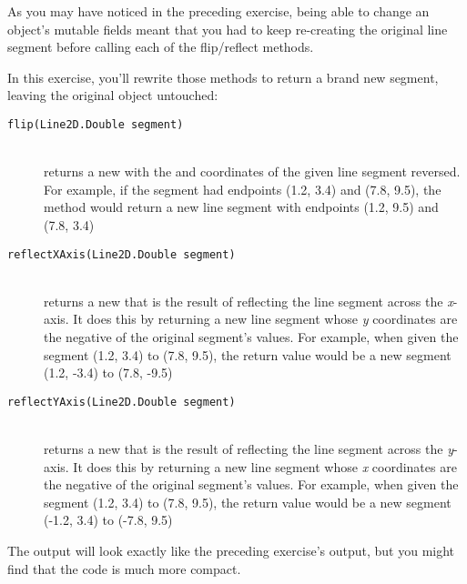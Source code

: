 \begin{exercise}
As you may have noticed in the preceding exercise, being able to change an object's mutable fields meant that you had to keep re-creating the original line segment before calling each of the flip/reflect methods.

In this exercise, you'll rewrite those methods to return a brand new  segment, leaving the original object untouched:

\begin{description}
  \item[\texttt{flip(Line2D.Double segment)}] \hfill \\ returns a new  with the  and  coordinates of the given line segment reversed. For example, if the segment had endpoints (1.2, 3.4) and (7.8, 9.5), the method would return a new line segment with endpoints (1.2, 9.5) and (7.8, 3.4)
  \item[\texttt{reflectXAxis(Line2D.Double segment)}] \hfill \\ returns a new  that is the result of reflecting the line segment across the {\em x}-axis. It does this by returning a new line segment whose {\em y} coordinates are the negative of the original segment's values. For example, when given the segment (1.2, 3.4) to (7.8, 9.5), the return value would be a new segment (1.2, -3.4) to (7.8, -9.5)
  \item[\texttt{reflectYAxis(Line2D.Double segment)}] \hfill \\ returns a new  that is the result of reflecting the line segment across the {\em y}-axis. It does this by returning a new line segment whose {\em x} coordinates are the negative of the original segment's values.  For example, when given the segment (1.2, 3.4) to (7.8, 9.5), the return value would be a new segment (-1.2, 3.4) to (-7.8, 9.5)
\end{description}

The output will look exactly like the preceding exercise's output, but you might find that the code is much more compact.

\end{exercise}

